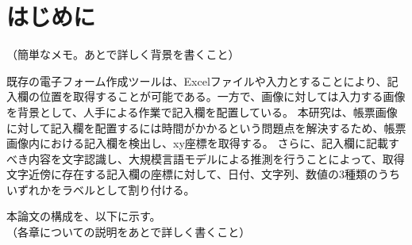 \chapter{はじめに}\label{cha:Introduction}
（簡単なメモ。あとで詳しく背景を書くこと）

既存の電子フォーム作成ツールは、Excelファイルや入力とすることにより、記入欄の位置を取得することが可能である。一方で、画像に対しては入力する画像を背景として、人手による作業で記入欄を配置している。
本研究は、帳票画像に対して記入欄を配置するには時間がかかるという問題点を解決するため、帳票画像内における記入欄を検出し、xy座標を取得する。
さらに、記入欄に記載すべき内容を文字認識し、大規模言語モデルによる推測を行うことによって、取得文字近傍に存在する記入欄の座標に対して、日付、文字列、数値の3種類のうちいずれかをラベルとして割り付ける。

本論文の構成を、以下に示す。\\
  （各章についての説明をあとで詳しく書くこと）
